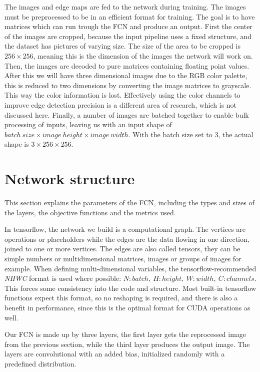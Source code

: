 \documentclass[12pt]{report}
\begin{document}
The images and edge maps are fed to the network during training. The images must be preprocessed to be in an efficient format for training. The goal is to have matrices which can run trough the FCN and produce an output. First the center of the images are cropped, because the input pipeline uses a fixed structure, and the dataset has pictures of varying size. The size of the area to be cropped is $256\times256$, meaning this is the dimension of the images the network will work on. Then, the images are decoded to pure matrices containing floating point values. After this we will have three dimensional images due to the RGB color palette, this is reduced to two dimensions by converting the image matrices to grayscale. This way the color information is lost. Effectively using the color channels to improve edge detection precision is a different area of research, which is not discussed here. Finally, a number of images are batched together to enable bulk processing of inputs, leaving us with an input shape of $ batch\ size\times image\ height\times image\ width $. With the batch size set to $3$, the actual shape is $ 3\times 256\times 256 $.
\section{Network structure}
This section explains the parameters of the FCN, including the types and sizes of the layers, the objective functions and the metrics used.

In tensorflow, the network we build is a computational graph. The vertices are operations or placeholders while the edges are the data flowing in one direction, joined to one or more vertices. The edges are also called tensors, they can be simple numbers or multidimensional matrices, images or groups of images for example.
When defining multi-dimensional variables, the tensorflow-recommended \textit{NHWC} format is used where possible: $ N:batch,\ H:height,\ W:width,\ C:channels. $ This forces some consistency into the code and structure. Most built-in tensorflow functions expect this format, so no reshaping is required, and there is also a benefit in performance, since this is the optimal format for CUDA operations as well.
 
Our FCN is made up by three layers, the first layer gets the reprocessed image from the previous section, while the third layer produces the output image. The layers are convolutional with an added bias, initialized randomly with a predefined distribution.
\end{document}
